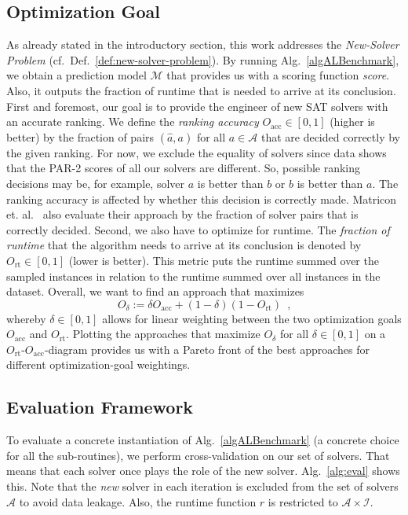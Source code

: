 \documentclass[runningheads]{llncs}
\begin{document}
\subsection{Optimization Goal}
\label{sec:goal}
As already stated in the introductory section, this work addresses the \emph{New-Solver Problem} (cf.~Def.~\ref{def:new-solver-problem}).
By running Alg.~\ref{algALBenchmark}, we obtain a prediction model $\mathcal{M}$ that provides us with a scoring function \emph{score}.
Also, it outputs the fraction of runtime that is needed to arrive at its conclusion.
First and foremost, our goal is to provide the engineer of new SAT solvers with an accurate ranking.
We define the \emph{ranking accuracy} $O_{\operatorname{acc}} \in \left[0, 1\right]$ (higher is better) by the fraction of pairs $\left(\hat{a}, a\right)$ for all $a \in \mathcal{A}$ that are decided correctly by the given ranking.
For now, we exclude the equality of solvers since data shows that the PAR-2 scores of all our solvers are different.
So, possible ranking decisions may be, for example, solver $a$ is better than $b$ or $b$ is better than $a$.
The ranking accuracy is affected by whether this decision is correctly made.
Matricon et. al.~\cite{MatriconAFSH21} also evaluate their approach by the fraction of solver pairs that is correctly decided.
Second, we also have to optimize for runtime.
The \emph{fraction of runtime} that the algorithm needs to arrive at its conclusion is denoted by $O_{\operatorname{rt}} \in \left[0, 1\right]$ (lower is better).
This metric puts the runtime summed over the sampled instances in relation to the runtime summed over all instances in the dataset.
Overall, we want to find an approach that maximizes
\begin{equation}
  O_\delta := \delta O_{\operatorname{acc}} + \left(1 - \delta\right) \left(1 - O_{\operatorname{rt}}\right) \enspace \textrm{,}
  \label{eq:opt}
\end{equation} 
whereby $\delta \in \left[0, 1\right]$ allows for linear weighting between the two optimization goals $O_{\operatorname{acc}}$ and $O_{\operatorname{rt}}$.
Plotting the approaches that maximize $O_\delta$ for all $\delta \in \left[0, 1\right]$ on a $O_{\operatorname{rt}}$-$O_{\operatorname{acc}}$-diagram provides us with a Pareto front of the best approaches for different optimization-goal weightings.

\subsection{Evaluation Framework}
\label{sec:evalframe}
To evaluate a concrete instantiation of Alg.~\ref{algALBenchmark} (a concrete choice for all the sub-routines), we perform cross-validation on our set of solvers.
That means that each solver once plays the role of the new solver.
Alg.~\ref{alg:eval} shows this.
Note that the \emph{new} solver in each iteration is excluded from the set of solvers $\mathcal{A}$ to avoid data leakage.
Also, the runtime function $r$ is restricted to $\mathcal{A} \times \mathcal{I}$.
\end{document}
